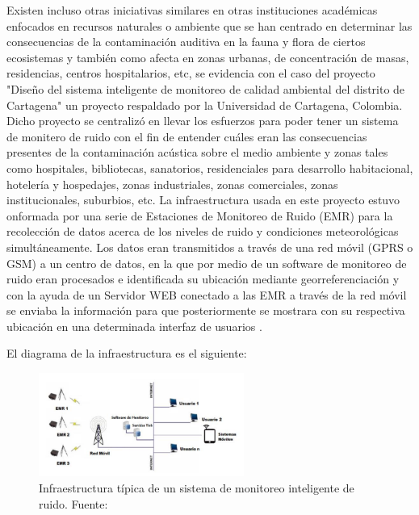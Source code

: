 {Existen incluso otras iniciativas similares en otras instituciones académicas enfocados en recursos naturales o ambiente que se han centrado en determinar las consecuencias de la contaminación auditiva en la fauna y flora de ciertos ecosistemas y también como afecta en zonas urbanas, de concentración de masas, residencias, centros hospitalarios, etc, se evidencia con el caso del proyecto "Diseño del sistema inteligente de monitoreo de calidad ambiental del distrito de Cartagena" un proyecto respaldado por la Universidad de Cartagena, Colombia. Dicho proyecto se centralizó en llevar los esfuerzos para poder tener un sistema de monitero de ruido con el fin de entender cuáles eran las consecuencias presentes de la contaminación acústica sobre el medio ambiente y zonas tales como hospitales, bibliotecas, sanatorios, residenciales para desarrollo habitacional, hotelería y hospedajes, zonas industriales, zonas comerciales, zonas institucionales, suburbios, etc. La infraestructura usada en este proyecto estuvo onformada por
una serie de Estaciones de Monitoreo de Ruido (EMR) para la recolección de datos acerca de los niveles de ruido y condiciones meteorológicas simultáneamente. Los datos eran transmitidos a través de una red móvil (GPRS o GSM) a un centro de datos, en la que por medio de un software de monitoreo de ruido eran procesados e
identificada su ubicación mediante georreferenciación y con la ayuda de un Servidor WEB conectado a las EMR a través de la red móvil se enviaba la información para que posteriormente se mostrara con su respectiva ubicación en una determinada interfaz de usuarios \parencite{epacartagena2015}.

El diagrama de la infraestructura es el siguiente:

\begin{figure}[H] 
    \centering
    \includegraphics[width=0.6\textwidth]{../img/SMI_cartagena.png}
    \caption{Infraestructura típica de un sistema de monitoreo inteligente de ruido. Fuente: \cite{epacartagena2015}}
    \label{fig:diagrama-sistema-cartagena}
\end{figure}

}

